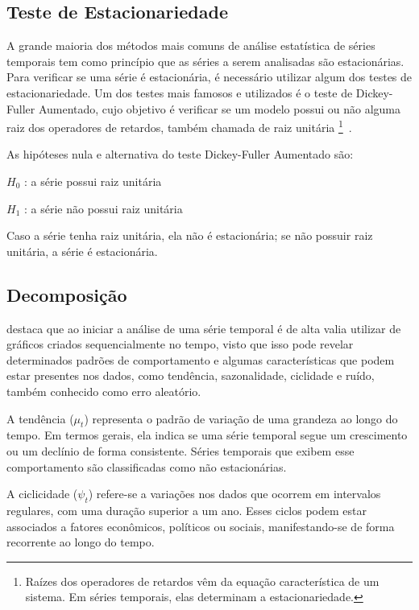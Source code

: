     \subsection{Teste de Estacionariedade}
        A grande maioria dos métodos mais comuns de análise estatística de séries temporais tem como princípio que as séries 
        a serem analisadas são estacionárias. Para verificar se uma série é estacionária, é necessário utilizar algum dos testes 
        de estacionariedade. Um dos testes mais famosos e utilizados é o teste de Dickey-Fuller Aumentado, cujo objetivo é 
        verificar se um modelo possui ou não alguma raiz dos operadores de retardos, também chamada de raiz unitária
        \footnote{Raízes dos operadores de retardos vêm da equação característica de um sistema. Em séries temporais, elas 
        determinam a estacionariedade.}~\cite{costa2019}.

        As hipóteses nula e alternativa do teste Dickey-Fuller Aumentado são:

        \begin{center}
            \(H_0\) : a série possui raiz unitária

            \(H_1\) : a série não possui raiz unitária
        \end{center}

        Caso a série tenha raiz unitária, ela não é estacionária; se não possuir raiz unitária, a série é estacionária.
    \subsection{Decomposição}

         destaca que ao iniciar a análise de uma série temporal é de alta valia utilizar de gráficos 
        criados sequencialmente no tempo, visto que isso pode revelar determinados padrões de comportamento e algumas 
        características que podem estar presentes nos dados, como tendência, sazonalidade, ciclidade e ruído, também 
        conhecido como erro aleatório. 
        
        A tendência ($\mu_t$) representa o padrão de variação de uma grandeza ao longo do tempo. Em termos gerais, ela indica se 
        uma série temporal segue um crescimento ou um declínio de forma consistente. Séries temporais que exibem esse comportamento 
        são classificadas como não estacionárias.

        
        A ciclicidade ($\psi_t$) refere-se a variações nos dados que ocorrem em intervalos regulares, com uma duração superior a um 
        ano. Esses ciclos podem estar associados a fatores econômicos, políticos ou sociais, manifestando-se de forma recorrente ao 
        longo do tempo.     
        
